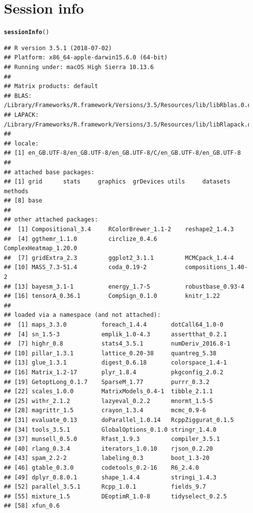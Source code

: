 \documentclass{article}\usepackage[]{graphicx}\usepackage[]{color}
\makeatletter
\newcommand{\hlstd}[1]{\textcolor[rgb]{0.345,0.345,0.345}{#1}}%
\newcommand{\hlkwd}[1]{\textcolor[rgb]{0.737,0.353,0.396}{\textbf{#1}}}%
\newenvironment{kframe}{%
 \def\at@end@of@kframe{}%
 \ifinner\ifhmode%
  \def\at@end@of@kframe{\end{minipage}}%
  \begin{minipage}{\columnwidth}%
 \fi\fi%
 \def\FrameCommand##1{\hskip\@totalleftmargin \hskip-\fboxsep
 \colorbox{shadecolor}{##1}\hskip-\fboxsep
     \hskip-\linewidth \hskip-\@totalleftmargin \hskip\columnwidth}%
 \MakeFramed {\advance\hsize-\width
   \@totalleftmargin\z@ \linewidth\hsize
   \@setminipage}}%
 {\par\unskip\endMakeFramed%
 \at@end@of@kframe}
\newenvironment{knitrout}{}{} %
\makeatother
\begin{document}
\clearpage
\printbibliography

\clearpage
\section{Session info}
\begin{knitrout}
\color{fgcolor}\begin{kframe}
\begin{alltt}
  \hlkwd{sessionInfo}\hlstd{()}
\end{alltt}
\begin{verbatim}
## R version 3.5.1 (2018-07-02)
## Platform: x86_64-apple-darwin15.6.0 (64-bit)
## Running under: macOS High Sierra 10.13.6
## 
## Matrix products: default
## BLAS: /Library/Frameworks/R.framework/Versions/3.5/Resources/lib/libRblas.0.dylib
## LAPACK: /Library/Frameworks/R.framework/Versions/3.5/Resources/lib/libRlapack.dylib
## 
## locale:
## [1] en_GB.UTF-8/en_GB.UTF-8/en_GB.UTF-8/C/en_GB.UTF-8/en_GB.UTF-8
## 
## attached base packages:
## [1] grid      stats     graphics  grDevices utils     datasets  methods  
## [8] base     
## 
## other attached packages:
##  [1] Compositional_3.4     RColorBrewer_1.1-2    reshape2_1.4.3       
##  [4] ggthemr_1.1.0         circlize_0.4.6        ComplexHeatmap_1.20.0
##  [7] gridExtra_2.3         ggplot2_3.1.1         MCMCpack_1.4-4       
## [10] MASS_7.3-51.4         coda_0.19-2           compositions_1.40-2  
## [13] bayesm_3.1-1          energy_1.7-5          robustbase_0.93-4    
## [16] tensorA_0.36.1        CompSign_0.1.0        knitr_1.22           
## 
## loaded via a namespace (and not attached):
##  [1] maps_3.3.0          foreach_1.4.4       dotCall64_1.0-0    
##  [4] sn_1.5-3            emplik_1.0-4.3      assertthat_0.2.1   
##  [7] highr_0.8           stats4_3.5.1        numDeriv_2016.8-1  
## [10] pillar_1.3.1        lattice_0.20-38     quantreg_5.38      
## [13] glue_1.3.1          digest_0.6.18       colorspace_1.4-1   
## [16] Matrix_1.2-17       plyr_1.8.4          pkgconfig_2.0.2    
## [19] GetoptLong_0.1.7    SparseM_1.77        purrr_0.3.2        
## [22] scales_1.0.0        MatrixModels_0.4-1  tibble_2.1.1       
## [25] withr_2.1.2         lazyeval_0.2.2      mnormt_1.5-5       
## [28] magrittr_1.5        crayon_1.3.4        mcmc_0.9-6         
## [31] evaluate_0.13       doParallel_1.0.14   RcppZiggurat_0.1.5 
## [34] tools_3.5.1         GlobalOptions_0.1.0 stringr_1.4.0      
## [37] munsell_0.5.0       Rfast_1.9.3         compiler_3.5.1     
## [40] rlang_0.3.4         iterators_1.0.10    rjson_0.2.20       
## [43] spam_2.2-2          labeling_0.3        boot_1.3-20        
## [46] gtable_0.3.0        codetools_0.2-16    R6_2.4.0           
## [49] dplyr_0.8.0.1       shape_1.4.4         stringi_1.4.3      
## [52] parallel_3.5.1      Rcpp_1.0.1          fields_9.7         
## [55] mixture_1.5         DEoptimR_1.0-8      tidyselect_0.2.5   
## [58] xfun_0.6
\end{verbatim}
\end{kframe}
\end{knitrout}
\end{document}
